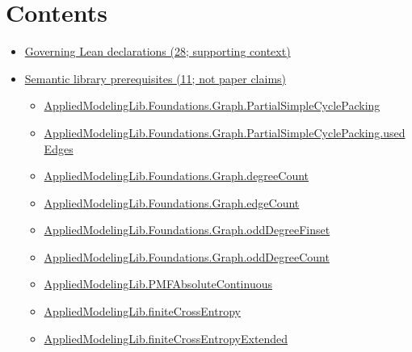 \documentclass[10pt]{article}
\begin{document}
\section*{Contents}
\begin{itemize}[leftmargin=1.2em]
\item \hyperlink{governing-declaration-section-5ef5ef0364b6939c}{Governing Lean declarations (28; supporting context)}
\item \hyperlink{library-section-d57e3bd7d5b09fe8}{Semantic library prerequisites (11; not paper claims)}
\begin{itemize}[leftmargin=1.2em]
\item \hyperlink{library-prerequisite-ce93e94db97efbc5}{Applied\allowbreak{}Modeling\allowbreak{}Lib.\allowbreak{}Foundations.\allowbreak{}Graph.\allowbreak{}Partial\allowbreak{}Simple\allowbreak{}Cycle\allowbreak{}Packing}
\item \hyperlink{library-prerequisite-85c21fec4413af63}{Applied\allowbreak{}Modeling\allowbreak{}Lib.\allowbreak{}Foundations.\allowbreak{}Graph.\allowbreak{}Partial\allowbreak{}Simple\allowbreak{}Cycle\allowbreak{}Packing.\allowbreak{}used\allowbreak{}Edges}
\item \hyperlink{library-prerequisite-44e965e1fe85fa7e}{Applied\allowbreak{}Modeling\allowbreak{}Lib.\allowbreak{}Foundations.\allowbreak{}Graph.\allowbreak{}degree\allowbreak{}Count}
\item \hyperlink{library-prerequisite-6a79a1f70f063e0d}{Applied\allowbreak{}Modeling\allowbreak{}Lib.\allowbreak{}Foundations.\allowbreak{}Graph.\allowbreak{}edge\allowbreak{}Count}
\item \hyperlink{library-prerequisite-86e6933bef4d808d}{Applied\allowbreak{}Modeling\allowbreak{}Lib.\allowbreak{}Foundations.\allowbreak{}Graph.\allowbreak{}odd\allowbreak{}Degree\allowbreak{}Finset}
\item \hyperlink{library-prerequisite-71d63b415ae0befc}{Applied\allowbreak{}Modeling\allowbreak{}Lib.\allowbreak{}Foundations.\allowbreak{}Graph.\allowbreak{}odd\allowbreak{}Degree\allowbreak{}Count}
\item \hyperlink{library-prerequisite-083f68c416cce750}{Applied\allowbreak{}Modeling\allowbreak{}Lib.\allowbreak{}PMF\allowbreak{}Absolute\allowbreak{}Continuous}
\item \hyperlink{library-prerequisite-ddb93e08a1d7a0d4}{Applied\allowbreak{}Modeling\allowbreak{}Lib.\allowbreak{}finite\allowbreak{}Cross\allowbreak{}Entropy}
\item \hyperlink{library-prerequisite-ee99b3357a3f9c8d}{Applied\allowbreak{}Modeling\allowbreak{}Lib.\allowbreak{}finite\allowbreak{}Cross\allowbreak{}Entropy\allowbreak{}Extended}

\end{itemize}
\end{itemize}
\end{document}
